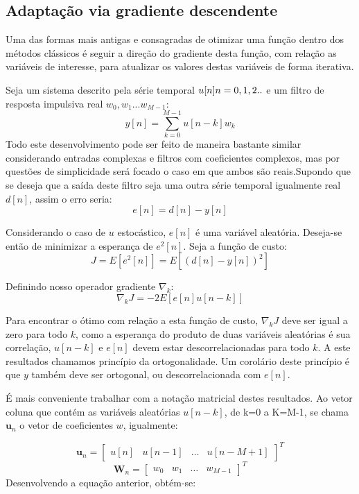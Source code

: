 \subsection{Adaptação via gradiente descendente}

Uma das formas mais antigas e consagradas de otimizar uma função dentro dos métodos clássicos é seguir a direção do gradiente desta função, com relação as variáveis de interesse, para atualizar os valores destas variáveis de forma iterativa.

Seja um sistema descrito pela série temporal $u[n] \space n=0,1,2..$ e um filtro de resposta impulsiva real $w_0, w_1 ... w_{M-1}$:
\begin{equation}
y[n]=\sum_{k=0}^{M-1}u[n-k]w_k
\end{equation}
Todo este desenvolvimento pode ser feito de maneira bastante similar considerando entradas complexas e filtros com coeficientes complexos, mas por questões de simplicidade será focado o caso em que ambos são reais.Supondo que se deseja que a saída deste filtro seja uma outra série temporal igualmente real $d[n]$, assim o erro seria:
\begin{equation}
e[n]=d[n]-y[n]    
\end{equation}

Considerando o caso de $u$ estocástico, $e[n]$ é uma variável aleatória. Deseja-se então de minimizar a esperança de $e^2[n]$. Seja a função de custo:
\begin{equation}
J=E[e^2[n]]=E[(d[n]-y[n])^2]   
\end{equation}

Definindo nosso operador gradiente $\nabla_k$:
\begin{equation}
\nabla_k J=-2 E[e[n]u[n-k]]   
\end{equation}

Para encontrar o ótimo com relação a esta função de custo, $\nabla_k J$ deve ser igual a zero para todo $k$, como a esperança do produto de duas variáveis aleatórias é sua correlação, $u[n-k]$ e $e[n]$ devem estar descorrelacionadas para todo $k$. A este resultados chamamos princípio da ortogonalidade. Um corolário deste princípio é que $y$ também deve ser ortogonal, ou descorrelacionada com $e[n]$.

\indent É mais conveniente trabalhar com a notação matricial destes resultados. Ao vetor coluna que contém as variáveis aleatórias $u[n-k]$, de k=0 a K=M-1, se chama $\boldsymbol{u}_n$ o vetor de coeficientes $w$, igualmente:

\begin{equation*}
\boldsymbol{u}_n=
\begin{bmatrix}
u[n] & u[n-1] & \dots & u[n-M+1]
\end{bmatrix}^T
\end{equation*}
\begin{equation*}
\boldsymbol{W}_n=
\begin{bmatrix}
w_0 & w_1 & \dots & w_{M-1}
\end{bmatrix}^T
\end{equation*}
Desenvolvendo a equação anterior, obtém-se:

